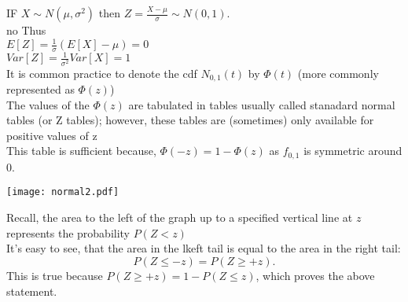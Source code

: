 \documentclass[20pt,landscape]{foils}
\newcommand{\no}{\noindent}
\begin{document}
{\foilhead[-.8in]{\textcolor{blue}{Standard Normal distribution }}\vspace*{2mm} 
\no IF $X \sim N(\mu, \sigma^{2})$ then $ Z= \frac{X - \mu}{\sigma} \sim N(0,1)$.\\[.1in]
no Thus\\[.15in]
\no \hspace*{2in} $E[Z] = \frac{1}{\sigma} (E[X] - \mu) = 0$ \\[.1in]
\no \hspace*{2in} $	Var[Z] = \frac{1}{\sigma^{2}} Var[X] = 1$\\[.15in]
\no It is common practice to denote the cdf $N_{0, 1}(t)$ by $\Phi(t)$ (more commonly represented as $\Phi(z)$) \\[.1in]
\no The values of the $\Phi(z)$  are tabulated in tables usually called stanadard normal tables (or Z tables); however, these tables are (sometimes) only available for positive values of z\\[.1in]
\no This table is sufficient because, $\Phi(-z) = 1 - \Phi(z)$ as $f_{0,1}$ is symmetric around 0.
    
\foilhead[-.8in]{\textcolor{blue}{Standard Normal distribution (cont'd) }}\vspace*{8mm}     
           
       \centerline{\texttt{[image: normal2.pdf]}}
\no Recall,  the area to the left of the graph up to a specified vertical line  at $z$ represents 
    the probability  $P(Z<z)$\\[.1in]
\no It's easy to see, that the area in the lkeft tail is equal to the area in the right tail:  
$$P(Z \le -z) = P(Z \ge +z).$$
\no This is true because $P(Z \ge  +z) = 1 - P(Z \le z)$, which proves the above statement.

}
\end{document}
